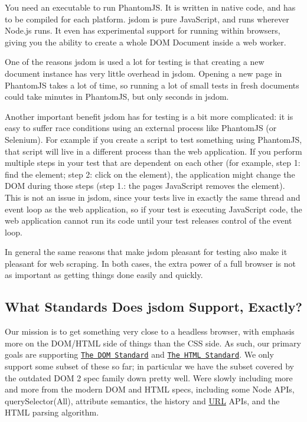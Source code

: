 You need an executable to run Phantom\+JS. It is written in native code, and has to be compiled for each platform. jsdom is pure Java\+Script, and runs wherever Node.\+js runs. It even has experimental support for running within browsers, giving you the ability to create a whole D\+OM Document inside a web worker.

One of the reasons jsdom is used a lot for testing is that creating a new document instance has very little overhead in jsdom. Opening a new page in Phantom\+JS takes a lot of time, so running a lot of small tests in fresh documents could take minutes in Phantom\+JS, but only seconds in jsdom.

Another important benefit jsdom has for testing is a bit more complicated\+: it is easy to suffer race conditions using an external process like Phantom\+JS (or Selenium). For example if you create a script to test something using Phantom\+JS, that script will live in a different process than the web application. If you perform multiple steps in your test that are dependent on each other (for example, step 1\+: find the element; step 2\+: click on the element), the application might change the D\+OM during those steps (step 1.\+: the page\textquotesingle{}s Java\+Script removes the element). This is not an issue in jsdom, since your tests live in exactly the same thread and event loop as the web application, so if your test is executing Java\+Script code, the web application cannot run its code until your test releases control of the event loop.

In general the same reasons that make jsdom pleasant for testing also make it pleasant for web scraping. In both cases, the extra power of a full browser is not as important as getting things done easily and quickly.

\subsection*{What Standards Does jsdom Support, Exactly?}

Our mission is to get something very close to a headless browser, with emphasis more on the D\+O\+M/\+H\+T\+ML side of things than the C\+SS side. As such, our primary goals are supporting \href{http://dom.spec.whatwg.org/}{\tt The D\+OM Standard} and \href{http://www.whatwg.org/specs/web-apps/current-work/multipage/}{\tt The H\+T\+ML Standard}. We only support some subset of these so far; in particular we have the subset covered by the outdated D\+OM 2 spec family down pretty well. We\textquotesingle{}re slowly including more and more from the modern D\+OM and H\+T\+ML specs, including some {\ttfamily Node} A\+P\+Is, {\ttfamily query\+Selector(\+All)}, attribute semantics, the history and \mbox{\hyperlink{namespace_u_r_l}{U\+RL}} A\+P\+Is, and the H\+T\+ML parsing algorithm.

